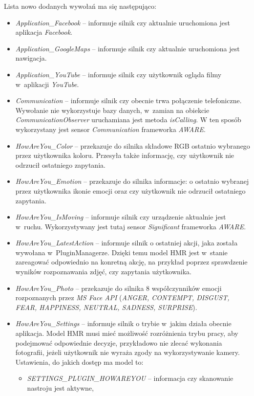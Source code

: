 Lista nowo dodanych wywołań ma się następująco: 

\begin{itemize}
	\item \textit{Application\_Facebook} -- informuje silnik czy aktualnie uruchomiona jest aplikacja \textit{Facebook}.
	
	\item \textit{Application\_GoogleMaps} -- informuje silnik czy aktualnie uruchomiona jest nawigacja.
	
	\item \textit{Application\_YouTube} -- informuje silnik czy użytkownik ogląda filmy w~aplikacji \textit{YouTube}.
	
	\item \textit{Communication} -- informuje silnik czy obecnie trwa połączenie telefoniczne. Wywołanie nie wykorzystuje bazy danych, w~zamian na obiekcie \textit{CommunicationObserver} uruchamiana jest metoda \textit{isCalling}. W ten sposób wykorzystany jest sensor \textit{Communication} frameworka \textit{AWARE}.
	
	\item \textit{HowAreYou\_Color} -- przekazuje do silnika składowe RGB ostatnio wybranego przez użytkownika koloru. Przesyła także informację, czy użytkownik nie odrzucił ostatniego zapytania.
	
	\item \textit{HowAreYou\_Emotion} -- przekazuje do silnika informacje: o ostatnio wybranej przez użytkownika ikonie emocji oraz czy użytkownik nie odrzucił ostatniego zapytania.
	
	\item \textit{HowAreYou\_IsMoving} -- informuje silnik czy urządzenie aktualnie jest w~ruchu. Wykorzystywany jest tutaj sensor \textit{Significant} frameworka \textit{AWARE}.
	
	\item \textit{HowAreYou\_LatestAction} -- informuje silnik o ostatniej akcji, jaka została wywołana w~PluginManagerze. Dzięki temu model HMR jest w~stanie zareagować odpowiednio na konretną akcję, na przykład poprzez sprawdzenie wyników rozpoznawania zdjęć, czy zapytania użytkownika.
	
	\item \textit{HowAreYou\_Photo} -- przekazuje do silnika 8 współczynników emocji rozpoznanych przez \textit{MS Face API} (\textit{ANGER, CONTEMPT, DISGUST, FEAR, HAPPINESS, NEUTRAL, SADNESS, SURPRISE}).
	
	\item \textit{HowAreYou\_Settings} -- informuje silnik o trybie w~jakim działa obecnie aplikacja. Model HMR musi mieć możliwość rozróżnienia trybu pracy, aby podejmować odpowiednie decyzje, przykładowo nie zlecać wykonania fotografii, jeżeli użytkownik nie wyraża zgody na wykorzystywanie kamery. Ustawienia, do jakich dostęp ma model to:
	\begin{itemize}
		\item \textit{SETTINGS\_PLUGIN\_HOWAREYOU} -- informacja czy skanowanie nastroju jest aktywne, 		 
		

\end{itemize}
\end{itemize}
